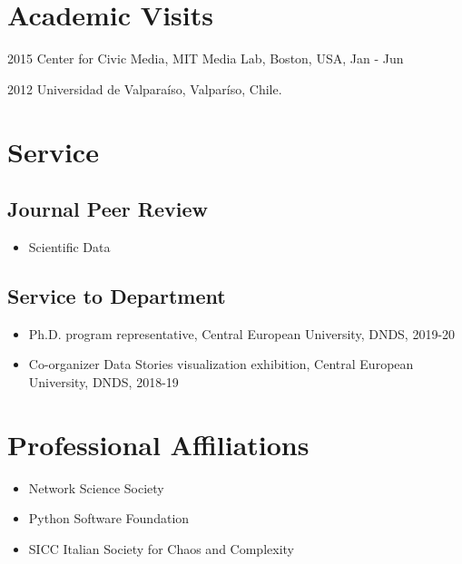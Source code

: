 \documentclass{academiccv}
\begin{document}
\section*{Academic Visits}
\begin{tablist}
	\item[2015] 	\tab Center for Civic Media, MIT Media Lab, Boston, USA, Jan - Jun
	\item[2012] 	\tab Universidad de Valparaíso, Valparíso, Chile.
\end{tablist}

\section*{Service}
\subsection*{Journal Peer Review}
\begin{itemize}
  \item Scientific Data
\end{itemize}

\subsection*{Service to Department}
\begin{itemize}
	\item Ph.D. program representative, Central European University, DNDS, 2019-20
	\item Co-organizer Data Stories visualization exhibition, Central European University, DNDS, 2018-19
\end{itemize}

\section*{Professional Affiliations}
\begin{itemize}
	\item Network Science Society
	\item Python Software Foundation
	\item SICC Italian Society for Chaos and Complexity
\end{itemize}
\end{document}
